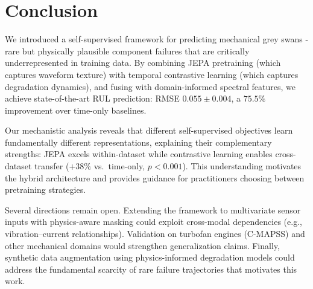 \section{Conclusion}
\label{sec:conclusion}

We introduced a self-supervised framework for predicting mechanical grey swans - rare but physically plausible component failures that are critically underrepresented in training data. By combining JEPA pretraining (which captures waveform texture) with temporal contrastive learning (which captures degradation dynamics), and fusing with domain-informed spectral features, we achieve state-of-the-art RUL prediction: RMSE $0.055 \pm 0.004$, a $75.5\%$ improvement over time-only baselines.

Our mechanistic analysis reveals that different self-supervised objectives learn fundamentally different representations, explaining their complementary strengths: JEPA excels within-dataset while contrastive learning enables cross-dataset transfer ($+38\%$ vs.\ time-only, $p < 0.001$). This understanding motivates the hybrid architecture and provides guidance for practitioners choosing between pretraining strategies.

Several directions remain open. Extending the framework to multivariate sensor inputs with physics-aware masking could exploit cross-modal dependencies (e.g., vibration--current relationships). Validation on turbofan engines (C-MAPSS) and other mechanical domains would strengthen generalization claims. Finally, synthetic data augmentation using physics-informed degradation models could address the fundamental scarcity of rare failure trajectories that motivates this work.
